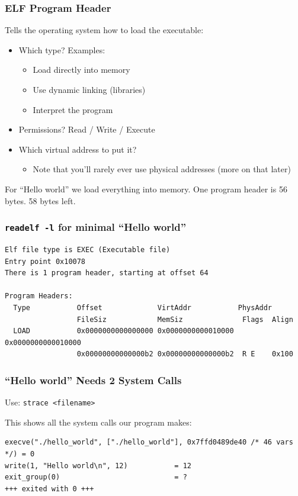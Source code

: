 \documentclass[aspectratio=169]{beamer}
\begin{document}
  \begin{frame}
    \frametitle{ELF Program Header}

    Tells the operating system how to load the executable:

    \begin{itemize}
      \item Which type? Examples:
        \begin{itemize}
          \item Load directly into memory
          \item Use dynamic linking (libraries)
          \item Interpret the program
        \end{itemize}
      \item Permissions? Read / Write / Execute
      \item Which virtual address to put it?
        \begin{itemize}
          \item Note that you'll rarely ever use physical addresses (more on
                that later)
        \end{itemize}
    \end{itemize}

    \vspace{2em}

    For ``Hello world'' we load everything into memory. One program header is 56
    bytes. 58 bytes left.
  \end{frame}

  \begin{frame}[fragile]
    \frametitle{\texttt{readelf -l} for minimal ``Hello world''}

    \begin{lstlisting}[basicstyle=\small\ttfamily]
Elf file type is EXEC (Executable file)
Entry point 0x10078
There is 1 program header, starting at offset 64

Program Headers:
  Type           Offset             VirtAddr           PhysAddr
                 FileSiz            MemSiz              Flags  Align
  LOAD           0x0000000000000000 0x0000000000010000 0x0000000000010000
                 0x00000000000000b2 0x00000000000000b2  R E    0x100
    \end{lstlisting}
  \end{frame}

  \begin{frame}[fragile]
    \frametitle{``Hello world'' Needs 2 System Calls}

    Use: \hspace{0.5em} \texttt{strace <filename>}

    \vspace{1em}
    
    This shows all the system calls our program makes:

    \begin{lstlisting}[basicstyle=\small\ttfamily]
execve("./hello_world", ["./hello_world"], 0x7ffd0489de40 /* 46 vars */) = 0
write(1, "Hello world\n", 12)           = 12
exit_group(0)                           = ?
+++ exited with 0 +++
    \end{lstlisting}
  \end{frame}
\end{document}
